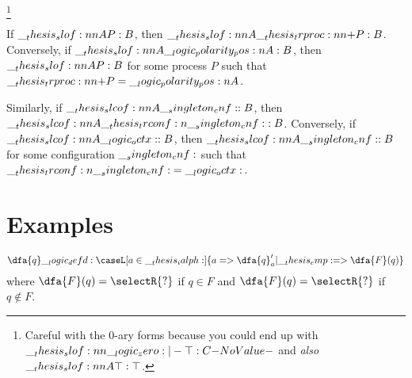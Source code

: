 
\footnote{Careful with the 0-ary forms because you could end up with $\slof{\zero |- \top : C}$ and \emph{also} $\slof{A |- \top : \top}$.}

\begin{theorem}
  If $\slof{A |- P : B}$, then $\slof{A |- \trproc[+]{P} : B}$.
  Conversely, if $\slof{A |- \p{A} : B}$, then $\slof{A |- P : B}$ for some process $P$ such that $\trproc[+]{P} = \p{A}$.

  Similarly, if $\slcof{A |- \cnf : B}$, then $\slcof{A |- \trconf{\cnf} : B}$.
  Conversely, if $\slcof{A |- \octx : B}$, then $\slcof{A |- \cnf : B}$ for some configuration $\__singleton_cnf:$ such that $\__thesis_trconf:n {\__singleton_cnf:} = \__logic_octx:$.
\end{theorem}


\section{Examples}

\begin{equation*}
  \dfa{q} \defd \caseL[a \in \ialph]{a => \dfa{q}'_a | \emp => \dfa{F}(q)}
\end{equation*}
where $\dfa{F}(q) = \selectR{?}$ if $q \in F$ and $\dfa{F}(q) = \selectR{?}$ if $q \notin F$.

